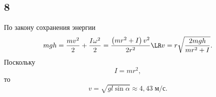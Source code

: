 \subsection{8}

По закону сохранения энергии
\[
mgh=\frac{mv^2}{2}+\frac{I\omega^2}{2}=\frac{\left(mr^2+I\right)v^2}{2r^2}\LR v=r\sqrt{\frac{2mgh}{mr^2+I}}.
\]
Поскольку
\[
I=mr^2,
\]
то
\[
v=\sqrt{gl\sin\alpha}\approx4{,}43\;\text{м/с}.
\]